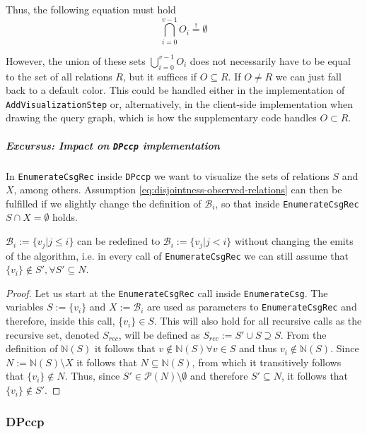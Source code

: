 Thus, the following equation must hold
\begin{equation}
\bigcap_{i=0}^{v-1}{O_i} \overset{!}{=} \emptyset
\label{eq:disjointness-observed-relations}
\end{equation}

However, the union of these sets $\bigcup_{i=0}^{v-1}{O_i}$ does not necessarily have to be equal to the set of all relations $R$, but it suffices if $O \subseteq {R}$. If $O \not= R$ we can just fall back to a  default color. This could be handled either in the implementation of \texttt{AddVisualizationStep} or, alternatively, in the client-side implementation when drawing the query graph, which is how the supplementary code handles $O \subset R$.

\subparagraph{Excursus: Impact on \texttt{DPccp} implementation}
In \texttt{EnumerateCsgRec} inside \texttt{DPccp} we want to visualize the sets of relations $S$ and $X$, among others.  Assumption \ref{eq:disjointness-observed-relations} can then be fulfilled if we slightly change the definition of $\mathcal{B}_i$, so that inside \texttt{EnumerateCsgRec} $S \cap X = \emptyset$ holds. 

\begin{conjecture}
$\mathcal{B}_i := \{v_j\vert j \leq i\}$ can be redefined to $\mathcal{B}_i := \{v_j\vert j < i\}$ without changing the emits of the algorithm, i.e. in every call of \texttt{EnumerateCsgRec} we can still assume that $\{v_i\} \notin S', \forall S' \subseteq N$.
\end{conjecture}

\begin{proof}
Let us start at the \texttt{EnumerateCsgRec} call inside \texttt{EnumerateCsg}. The variables $S := \{v_i\}$ and $X := \mathcal{B}_i$ are used as parameters to \texttt{EnumerateCsgRec} and therefore, inside this call, \{$v_i\} \in S$. This will also hold for all recursive calls as the recursive set, denoted $S_{rec}$, will be defined as  $S_{rec} := S' \cup S \supseteq S$. From the definition of $\mathbb{N}(S)$ it follows that $v \notin \mathbb{N}(S) \forall v \in S $ and thus $v_i \notin \mathbb{N}(S)$. Since $N := \mathbb{N}(S)\setminus X$ it follows that $N \subseteq \mathbb{N}(S)$, from which it transitively follows that $\{v_i\} \notin N$. Thus, since $S' \in \mathcal{P}(N)\setminus\emptyset$ and therefore $S' \subseteq N$, it follows that $\{v_i\} \notin S'$.

\end{proof}

\subsubsection{DPccp}
\label{subsub:implementation-dpccp}

